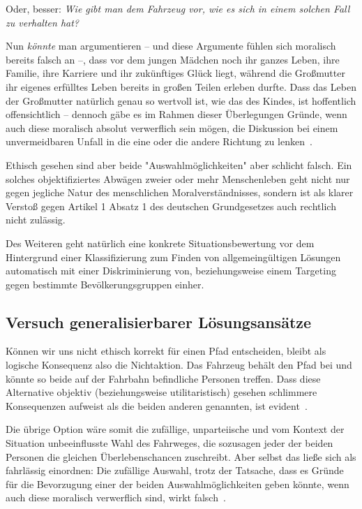 \documentclass[twocolumn, german]{tum-article}
\begin{document}
Oder, besser: \emph{Wie gibt man dem Fahrzeug vor, wie es sich in einem solchen Fall zu verhalten hat?}

Nun \emph{könnte} man argumentieren -- und diese Argumente fühlen sich moralisch bereits falsch an --, dass vor dem jungen Mädchen noch ihr ganzes Leben, ihre Familie, ihre Karriere und ihr zukünftiges Glück liegt, während die Großmutter ihr eigenes erfülltes Leben bereits in großen Teilen erleben durfte.
Dass das Leben der Großmutter natürlich genau so wertvoll ist, wie das des Kindes, ist hoffentlich offensichtlich -- dennoch gäbe es im Rahmen dieser Überlegungen Gründe, wenn auch diese moralisch absolut verwerflich sein mögen, die Diskussion bei einem unvermeidbaren Unfall in die eine oder die andere Richtung zu lenken~\cite[S. 69f.]{maurer-autonomous}.

Ethisch gesehen sind aber beide "Auswahlmöglichkeiten" aber schlicht falsch.
Ein solches objektifiziertes Abwägen zweier oder mehr Menschenleben geht nicht nur gegen jegliche Natur des menschlichen Moralverständnisses, sondern ist als klarer Verstoß gegen Artikel 1 Absatz 1 des deutschen Grundgesetzes auch rechtlich nicht zulässig.

Des Weiteren geht natürlich eine konkrete Situationsbewertung vor dem Hintergrund einer Klassifizierung zum Finden von allgemeingültigen Lösungen automatisch mit einer Diskriminierung von, beziehungsweise einem Targeting gegen bestimmte Bevölkerungsgruppen einher.


\subsection{Versuch generalisierbarer Lösungsansätze}
Können wir uns nicht ethisch korrekt für einen Pfad entscheiden, bleibt als logische Konsequenz also die Nichtaktion.
Das Fahrzeug behält den Pfad bei und könnte so beide auf der Fahrbahn befindliche Personen treffen.
Dass diese Alternative objektiv (beziehungsweise utilitaristisch) gesehen schlimmere Konsequenzen aufweist als die beiden anderen genannten, ist evident~\cite[S. 70]{maurer-autonomous}.

Die übrige Option wäre somit die zufällige, unparteiische und vom Kontext der Situation unbeeinflusste Wahl des Fahrweges, die sozusagen jeder der beiden Personen die gleichen Überlebenschancen zuschreibt.
Aber selbst das ließe sich als fahrlässig einordnen:
Die zufällige Auswahl, trotz der Tatsache, dass es Gründe für die Bevorzugung einer der beiden Auswahlmöglichkeiten geben könnte, wenn auch diese moralisch verwerflich sind, wirkt falsch~\cite[S. 71]{maurer-autonomous}.
\end{document}
